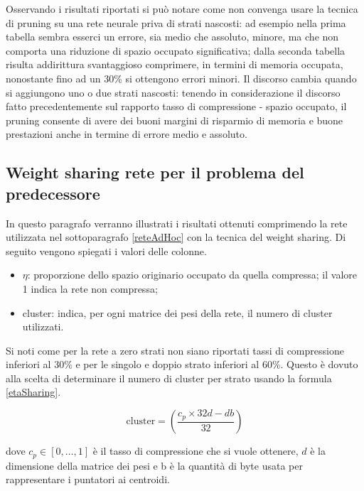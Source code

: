 \documentclass[12pt]{report}
\begin{document}


\par\null\par
Osservando i risultati riportati si può notare come non convenga usare la tecnica di pruning su una rete neurale priva di strati nascosti: ad esempio nella prima tabella sembra esserci un errore, sia medio che assoluto, minore, ma che non comporta una riduzione di spazio occupato significativa; dalla seconda tabella risulta addirittura svantaggioso comprimere, in termini di memoria occupata, nonostante fino ad un 30\% si ottengono errori minori. Il discorso cambia quando si aggiungono uno o due strati nascosti: tenendo in considerazione il discorso fatto precedentemente sul rapporto tasso di compressione - spazio occupato, il pruning consente di avere dei buoni margini di risparmio di memoria e buone prestazioni anche in termine di errore medio e assoluto.
\newpage

\subsection{Weight sharing rete per il problema del predecessore}
In questo paragrafo verranno illustrati i risultati ottenuti comprimendo la rete utilizzata nel sottoparagrafo \ref{reteAdHoc} con la tecnica del weight sharing.
Di seguito vengono spiegati i valori delle colonne.
\begin{itemize}
\item{$\eta$}: proporzione dello spazio originario occupato da quella compressa; il valore 1 indica la rete non compressa;
\item{cluster}: indica, per ogni matrice dei pesi della rete, il numero di cluster utilizzati.
\end{itemize}
\par\null\par
Si noti come per la rete a zero strati non siano riportati tassi di compressione inferiori al 30\% e per le singolo e doppio strato inferiori al 60\%. Questo è dovuto alla scelta di determinare il numero di cluster per strato usando la formula \eqref{etaSharing}.

\begin{equation}
\mathrm{cluster}=\left(\frac{c_p \times 32d - db}{32}\right)
\label{etaSharing}
\end{equation}
\par\null\par
dove $c_p \in [0,\dots,1]$ è il tasso di compressione che si vuole ottenere, $d$ è la dimensione della matrice dei pesi e b è la quantità di byte usata per rappresentare i puntatori ai centroidi.
\end{document}
